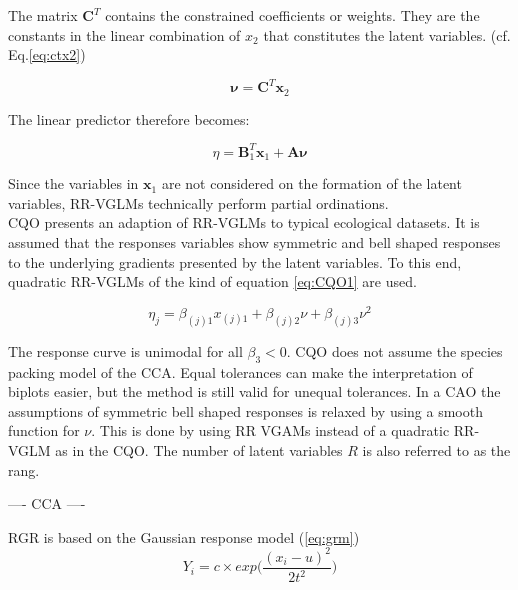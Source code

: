  The matrix $\mathbf{C}^T$ contains the constrained coefficients or weights. They are the constants in the linear combination of $x_2$ that constitutes the latent variables. (cf. Eq.\ref{eq:ctx2})
 
 \begin{equation}\label{eq:ctx2}\tag{2.2.4}
 \mathbf{\nu} = \mathbf{C}^T \mathbf{x}_2	
 \end{equation}
 
 The linear predictor therefore becomes:
 
 \begin{equation}\label{eq:ctx3}\tag{2.2.5}
 \eta = \mathbf{B}_1^T \mathbf{x}_1 + \mathbf{A} \mathbf{\nu}	
 \end{equation}
 
 Since the variables in $\mathbf{x}_1$ are not considered on the formation of the latent variables, RR-VGLMs technically perform partial ordinations. \\
 CQO presents an adaption of RR-VGLMs to typical ecological datasets. It is assumed that the responses variables show symmetric and bell shaped responses to the underlying gradients presented by the latent variables. To this end, quadratic RR-VGLMs of the kind of equation \ref{eq:CQO1} are used.
 
 \begin{equation}\label{eq:CQO1} \tag{2.2.6}
 \eta_j = \beta_{(j)1} x_{(j)1} + \beta_{(j)2} \nu + \beta_{(j)3} \nu^2	
 \end{equation} 
 
 The response curve is unimodal for all $\beta_3 < 0$.
 CQO does not assume the species packing model of the CCA.  Equal tolerances can make the interpretation of biplots easier, but the method is still valid for unequal tolerances. 
 In a CAO the assumptions of symmetric bell shaped responses is relaxed by using a smooth function for $\nu$. This is done by using RR VGAMs instead of a quadratic RR-VGLM as in the CQO. 
 The number of latent variables $R$ is also referred to as the rang. 
 
 
  ---- CCA ---- %
 
 	\noindent RGR is based on the Gaussian response model (\ref{eq:grm})
 \begin{equation} \label{eq:grm}
 Y_i = c \times exp\bigg(\frac{(x_i - u)^2}{2t^2}\bigg)
 \end{equation}
 

